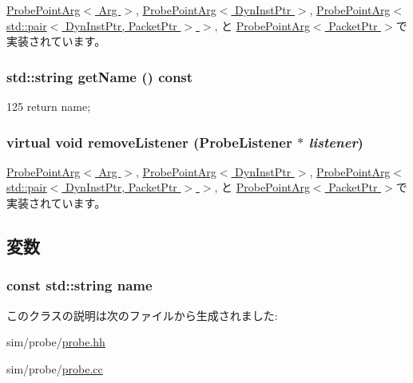 \hyperlink{classProbePointArg_ac282f544c73aa50eaed3d43845d122d3}{ProbePointArg$<$ Arg $>$}, \hyperlink{classProbePointArg_ac282f544c73aa50eaed3d43845d122d3}{ProbePointArg$<$ DynInstPtr $>$}, \hyperlink{classProbePointArg_ac282f544c73aa50eaed3d43845d122d3}{ProbePointArg$<$ std::pair$<$ DynInstPtr, PacketPtr $>$ $>$}, と \hyperlink{classProbePointArg_ac282f544c73aa50eaed3d43845d122d3}{ProbePointArg$<$ PacketPtr $>$}で実装されています。\hypertarget{classProbePoint_a33957ff81d96d5eb86be59fea5034afd}{
\subsubsection[{getName}]{\setlength{\rightskip}{0pt plus 5cm}std::string getName () const}}
\label{classProbePoint_a33957ff81d96d5eb86be59fea5034afd}



\begin{DoxyCode}
125 { return name; }
\end{DoxyCode}
\hypertarget{classProbePoint_a6a2be0b9d814476147edeeb5afac43a0}{
\subsubsection[{removeListener}]{\setlength{\rightskip}{0pt plus 5cm}virtual void removeListener ({\bf ProbeListener} $\ast$ {\em listener})}}
\label{classProbePoint_a6a2be0b9d814476147edeeb5afac43a0}


\hyperlink{classProbePointArg_a4b64aec02f5b387eaddd083a3889ca79}{ProbePointArg$<$ Arg $>$}, \hyperlink{classProbePointArg_a4b64aec02f5b387eaddd083a3889ca79}{ProbePointArg$<$ DynInstPtr $>$}, \hyperlink{classProbePointArg_a4b64aec02f5b387eaddd083a3889ca79}{ProbePointArg$<$ std::pair$<$ DynInstPtr, PacketPtr $>$ $>$}, と \hyperlink{classProbePointArg_a4b64aec02f5b387eaddd083a3889ca79}{ProbePointArg$<$ PacketPtr $>$}で実装されています。

\subsection{変数}
\hypertarget{classProbePoint_ac673bc430bdc3fdaa09f7becf98ef267}{
\subsubsection[{name}]{\setlength{\rightskip}{0pt plus 5cm}const std::string {\bf name}}}
\label{classProbePoint_ac673bc430bdc3fdaa09f7becf98ef267}


このクラスの説明は次のファイルから生成されました:\begin{DoxyCompactItemize}
\item 
sim/probe/\hyperlink{probe_8hh}{probe.hh}\item 
sim/probe/\hyperlink{probe_8cc}{probe.cc}\end{DoxyCompactItemize}
